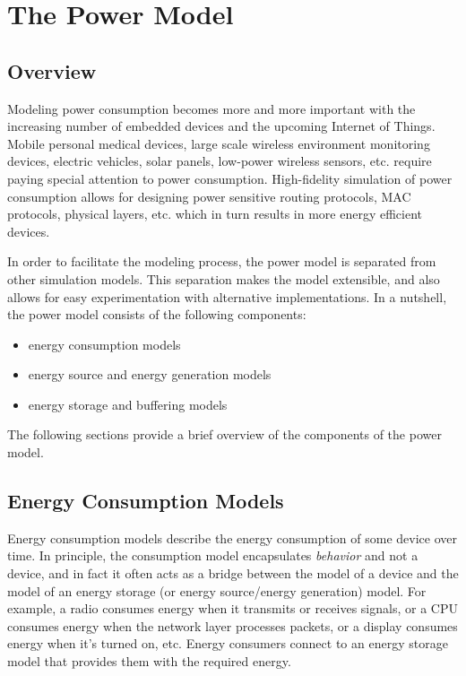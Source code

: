 \chapter{The Power Model}
\label{cha:power}

\section{Overview}

Modeling power consumption becomes more and more important with the increasing
number of embedded devices and the upcoming Internet of Things. Mobile personal
medical devices, large scale wireless environment monitoring devices, electric
vehicles, solar panels, low-power wireless sensors, etc. require paying special
attention to power consumption. High-fidelity simulation of power
consumption allows for designing power sensitive routing protocols, MAC protocols,
physical layers, etc. which in turn results in more energy efficient devices.

In order to facilitate the modeling process, the power model is separated from other
simulation models. This separation makes the model extensible, and also allows for
easy experimentation with alternative implementations. In a nutshell, the power
model consists of the following components:

\begin{itemize}
  \item energy consumption models
  \item energy source and energy generation models
  \item energy storage and buffering models
\end{itemize}


The following sections provide a brief overview of the components of the power model.

\section{Energy Consumption Models}

Energy consumption models describe the energy consumption of some device
over time. In principle, the consumption model encapsulates
\textit{behavior} and not a device, and in fact it often acts as a bridge
between the model of a device and the model of an energy storage (or energy
source/energy generation) model. For example, a radio consumes energy when
it transmits or receives signals, or a CPU consumes energy when the network
layer processes packets, or a display consumes energy when it's turned on,
etc. Energy consumers connect to an energy storage model that provides them
with the required energy.

